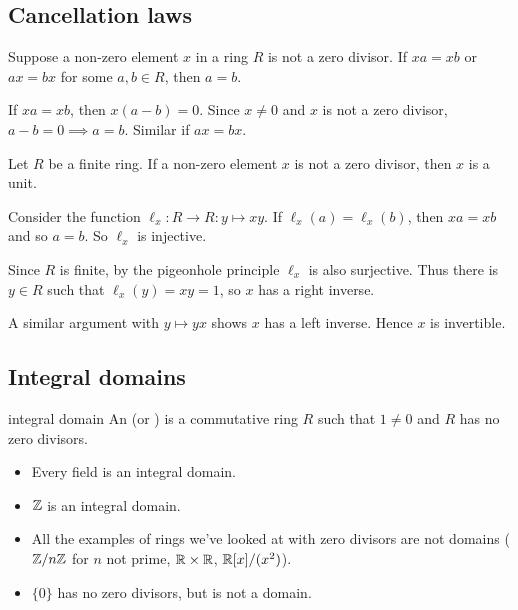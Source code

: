 \documentclass[12pt,letterpaper]{report}
\begin{document}
\pagebreak
\subsection{Cancellation laws}

\begin{prop}{}{}
  Suppose a non-zero element $x$ in a ring $R$ is not a zero divisor.
  If $xa = xb$ or $ax = bx$ for some $a, b \in R$, then $a = b$.
\end{prop}

\begin{thmproof}
  If $xa = xb$, then $x(a - b) = 0$.
  Since $x \neq 0$ and $x$ is not a zero divisor, $a - b = 0 \implies a = b$.
  Similar if $ax = bx$.
\end{thmproof}

\begin{cor}{}{}
  Let $R$ be a finite ring.
  If a non-zero element $x$ is not a zero divisor, then $x$ is a unit.
\end{cor}

\begin{thmproof}
  Consider the function $\ell_x \colon R \to R : y \mapsto xy$.
  If $\ell_x(a) = \ell_x(b)$, then $xa = xb$ and so $a = b$.
  So $\ell_x$ is injective.

  Since $R$ is finite, by the pigeonhole principle $\ell_x$ is also surjective.
  Thus there is $y \in R$ such that $\ell_x(y) = xy = 1$, so $x$ has a right inverse.

  A similar argument with $y \mapsto yx$ shows $x$ has a left inverse.
  Hence $x$ is invertible.
\end{thmproof}

\pagebreak
\subsection{Integral domains}

\begin{defn}{integral domain}{}
  An  (or ) is a commutative ring $R$ such that $1 \neq 0$
  and $R$ has no zero divisors.
\end{defn}

\begin{ex}
  \begin{itemize}
    \item Every field is an integral domain.
    \item $\mathbb{Z}$ is an integral domain.
    \item All the examples of rings we've looked at with zero divisors are not domains
      ($\mathbb{Z}/{n}\mathbb{Z}$ for $n$ not prime, $\mathbb{R} \times \mathbb{R}$, $\mathbb{R}[x]/(x^2)$).
    \item $\{0\}$ has no zero divisors, but is not a domain.
  \end{itemize}
\end{ex}
\end{document}

